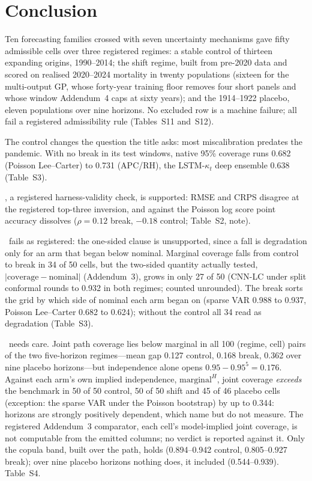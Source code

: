 \section{Conclusion}
\label{sec:conclusion}

Ten forecasting families crossed with seven uncertainty mechanisms gave fifty
admissible cells over three registered regimes: a stable control of thirteen
expanding origins, 1990--2014; the shift regime, built from pre-2020 data and
scored on realised 2020--2024 mortality in twenty populations (sixteen for the
multi-output GP, whose forty-year training floor removes four short panels and
whose window Addendum~4 caps at sixty years); and the 1914--1922 placebo,
eleven populations over nine horizons. No excluded row is a machine failure;
all fail a registered admissibility rule (Tables~S11 and~S12).

The control changes the question the title asks: most miscalibration predates
the pandemic. With no break in its test windows, native 95\% coverage runs
0.682 (Poisson Lee--Carter) to 0.731 (APC/RH), the LSTM-$\kappa_t$ deep
ensemble 0.638 (Table~S3).

\Hone, a registered harness-validity check, is supported: RMSE and CRPS
disagree at the registered top-three inversion, and against the Poisson log
score point accuracy dissolves ($\rho=0.12$ break, $-0.18$ control; Table~S2,
note).

\Htwo\ fails as registered: the one-sided clause is unsupported, since a fall
is degradation only for an arm that began below nominal. Marginal coverage
falls from control to break in 34 of 50 cells, but the two-sided quantity
actually tested, $|\text{coverage}-\text{nominal}|$ (Addendum~3), grows in only
27 of 50 (CNN-LC under split conformal rounds to 0.932 in both regimes; counted
unrounded). The break sorts the grid by which side of nominal each arm began on
(sparse VAR 0.988 to 0.937, Poisson Lee--Carter 0.682 to 0.624); without the
control all 34 read as degradation (Table~S3).

\Hthree\ needs care. Joint path coverage lies below marginal in all 100
(regime, cell) pairs of the two five-horizon regimes---mean gap 0.127 control,
0.168 break, 0.362 over nine placebo horizons---but independence alone opens
$0.95-0.95^5=0.176$. Against each arm's own implied independence,
$\text{marginal}^H$, joint coverage \emph{exceeds} the benchmark in 50 of 50
control, 50 of 50 shift and 45 of 46 placebo cells (exception: the sparse VAR
under the Poisson bootstrap) by up to 0.344: horizons are strongly positively
dependent, which \citet{dowd2010backtesting} name but do not measure. The
registered Addendum~3 comparator, each cell's model-implied joint coverage, is
not computable from the emitted columns; no verdict is reported against it.
Only the copula band, built over the path, holds (0.894--0.942 control,
0.805--0.927 break); over nine placebo horizons nothing does, it included
(0.544--0.939). Table~S4.

